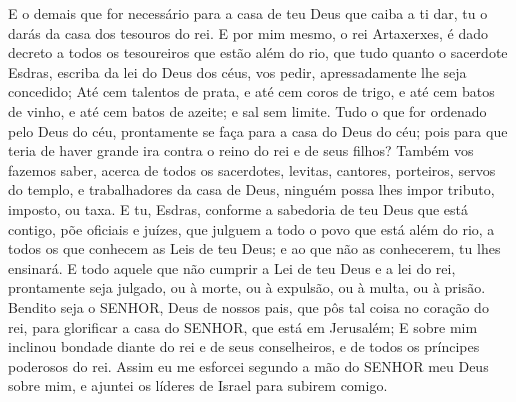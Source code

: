 {E o demais que for necessário para a casa de teu Deus que caiba a ti dar, tu o darás da casa dos tesouros do rei.
E por mim mesmo, o rei Artaxerxes, é dado decreto a todos os tesoureiros que estão além do rio, que tudo quanto o sacerdote Esdras, escriba da lei do Deus dos céus, vos pedir, apressadamente lhe seja concedido;
Até cem talentos de prata, e até cem coros de trigo, e até cem batos de vinho, e até cem batos de azeite; e sal sem limite.
Tudo o que for ordenado pelo Deus do céu, prontamente se faça para a casa do Deus do céu; pois para que teria de haver grande ira contra o reino do rei e de seus filhos?
Também vos fazemos saber, acerca de todos os sacerdotes, levitas, cantores, porteiros, servos do templo, e trabalhadores da casa de Deus, ninguém possa lhes impor tributo, imposto, ou taxa.
E tu, Esdras, conforme a sabedoria de teu Deus que está contigo,
 põe oficiais e juízes, que julguem a todo o povo que está além do rio, a todos os que conhecem as Leis de teu Deus; e ao que não as conhecerem, tu lhes ensinará.
E todo aquele que não cumprir a Lei de teu Deus e a lei do rei, prontamente seja julgado, ou à morte, ou à expulsão, ou à multa, ou à prisão.
Bendito seja o SENHOR, Deus de nossos pais, que pôs tal coisa no coração do rei, para glorificar a casa do SENHOR, que está em Jerusalém;
E sobre mim inclinou bondade diante do rei e de seus conselheiros, e de todos os príncipes poderosos do rei. Assim eu me esforcei segundo a mão do SENHOR meu Deus sobre mim, e ajuntei os líderes de Israel para subirem comigo.

}
